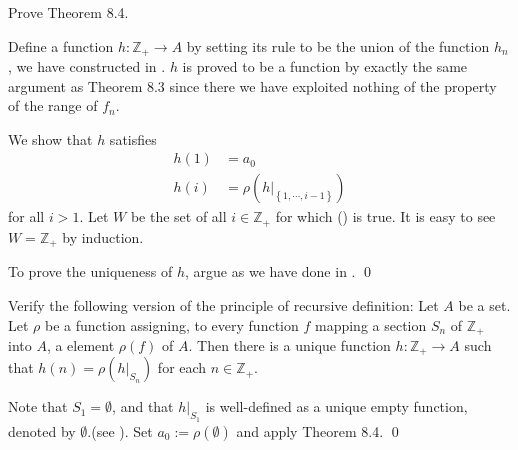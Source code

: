 \documentclass[a4paper,12pt]{article}
\begin{document}
\begin{exe}
	Prove Theorem 8.4.
\end{exe}
\begin{sol}
	Define a function \( h:\mathbb{Z}_{+} \to A \)
	by setting its rule to be the union of the function \( h_n \),
	we have constructed in .
	\( h \)
	is proved to be a function by exactly the same argument as Theorem 8.3
	since there we have exploited nothing of the property of the range of \( f_n \).
	
	We show that \( h \) satisfies
	\begin{equation}\label{eq:recursive2}
		\begin{split}
			h(1)&=a_0\\
			h(i)&=\rho \left( h |_{\left\{1, \cdots, i-1 \right\}} \right)
		\end{split}
	\end{equation}
	for all \( i >1 \).
	Let \( W \) be the set of all \( i \in \mathbb{Z}_{+} \) for which
	() is true.
	It is easy to see \( W= \mathbb{Z}_{+} \) by induction.
	
	To prove the uniqueness of \( h \),
	argue as we have done in .
	\qed\end{sol}

\begin{exe}
	Verify the following version of the principle of recursive definition:
	Let \( A \) be a set.
	Let \( \rho \) be a function assigning,
	to every function \( f \) mapping a section \( S_n \) of \( \mathbb{Z}_{+} \) into \( A \),
	a element \( \rho(f) \) of \( A \).
	Then there is a unique function \( h:\mathbb{Z}_{+} \to A \) such that
	\( h(n)=\rho(h|_{S_n}) \)
	for each \( n \in \mathbb{Z}_{+} \).
\end{exe}
\begin{sol}
	Note that \( S_1 = \emptyset \), and that \( h|_{S_1} \) is well-defined as a unique empty function, denoted by \( \emptyset \).(see ).
	Set \( a_0:=\rho (\emptyset) \)
	and apply Theorem 8.4.
	\qed\end{sol}
\end{document}
